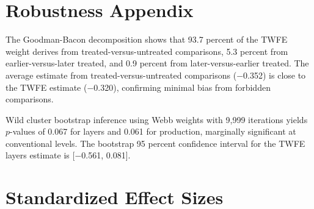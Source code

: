 \documentclass[12pt]{article}
\begin{document}
\section{Robustness Appendix}

The Goodman-Bacon decomposition shows that 93.7 percent of the TWFE weight derives from treated-versus-untreated comparisons, 5.3 percent from earlier-versus-later treated, and 0.9 percent from later-versus-earlier treated. The average estimate from treated-versus-untreated comparisons ($-$0.352) is close to the TWFE estimate ($-$0.320), confirming minimal bias from forbidden comparisons.

Wild cluster bootstrap inference using Webb weights with 9,999 iterations yields $p$-values of 0.067 for layers and 0.061 for production, marginally significant at conventional levels. The bootstrap 95 percent confidence interval for the TWFE layers estimate is [$-$0.561, 0.081].

\section{Standardized Effect Sizes}
\label{sec:sde}


\end{document}
